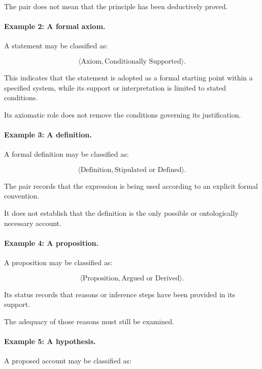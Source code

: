The pair
does not
mean that
the principle
has been
deductively
proved.

\paragraph{Example 2: A formal axiom.}

A statement
may be classified
as:

\[
    \langle
        \text{Axiom},
        \text{Conditionally Supported}
    \rangle.
\]

This indicates
that the statement
is adopted
as a formal
starting point
within a specified
system, while
its support
or interpretation
is limited
to stated
conditions.

Its axiomatic
role does
not remove
the conditions
governing its
justification.

\paragraph{Example 3: A definition.}

A formal
definition
may be classified
as:

\[
    \langle
        \text{Definition},
        \text{Stipulated or Defined}
    \rangle.
\]

The pair
records that
the expression
is being
used according
to an explicit
formal convention.

It does
not establish
that the
definition
is the
only possible
or ontologically
necessary
account.

\paragraph{Example 4: A proposition.}

A proposition
may be classified
as:

\[
    \langle
        \text{Proposition},
        \text{Argued or Derived}
    \rangle.
\]

Its status
records that
reasons or
inference steps
have been
provided in
its support.

The adequacy
of those
reasons must
still be
examined.

\paragraph{Example 5: A hypothesis.}

A proposed
account may
be classified
as:

